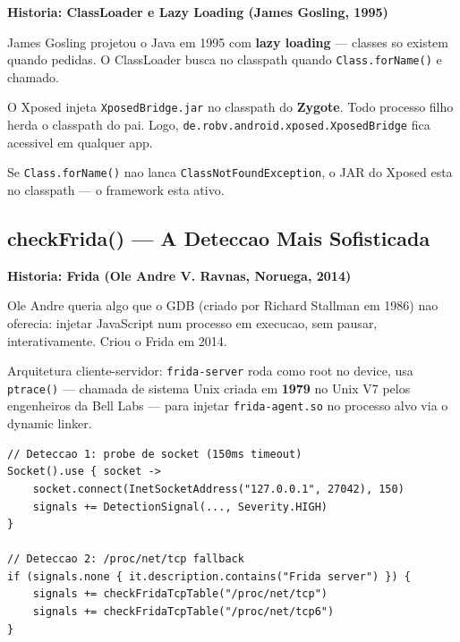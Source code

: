 \documentclass[12pt,a4paper]{article}
\begin{document}
\begin{historybox}
\textbf{Historia: ClassLoader e Lazy Loading (James Gosling, 1995)}

James Gosling projetou o Java em 1995 com \textbf{lazy loading} --- classes
so existem quando pedidas. O ClassLoader busca no classpath quando
\texttt{Class.forName()} e chamado.

O Xposed injeta \texttt{XposedBridge.jar} no classpath do \textbf{Zygote}.
Todo processo filho herda o classpath do pai. Logo,
\texttt{de.robv.android.xposed.XposedBridge} fica acessivel em qualquer app.

Se \texttt{Class.forName()} nao lanca \texttt{ClassNotFoundException},
o JAR do Xposed esta no classpath --- o framework esta ativo.
\end{historybox}

\subsection{checkFrida() --- A Deteccao Mais Sofisticada}

\begin{historybox}
\textbf{Historia: Frida (Ole Andre V. Ravnas, Noruega, 2014)}

Ole Andre queria algo que o GDB (criado por Richard Stallman em 1986)
nao oferecia: injetar JavaScript num processo em execucao, sem pausar,
interativamente. Criou o Frida em 2014.

Arquitetura cliente-servidor: \texttt{frida-server} roda como root no device,
usa \texttt{ptrace()} --- chamada de sistema Unix criada em \textbf{1979}
no Unix V7 pelos engenheiros da Bell Labs --- para injetar \texttt{frida-agent.so}
no processo alvo via o dynamic linker.
\end{historybox}

\begin{lstlisting}
// Deteccao 1: probe de socket (150ms timeout)
Socket().use { socket ->
    socket.connect(InetSocketAddress("127.0.0.1", 27042), 150)
    signals += DetectionSignal(..., Severity.HIGH)
}

// Deteccao 2: /proc/net/tcp fallback
if (signals.none { it.description.contains("Frida server") }) {
    signals += checkFridaTcpTable("/proc/net/tcp")
    signals += checkFridaTcpTable("/proc/net/tcp6")
}
\end{lstlisting}
\end{document}
